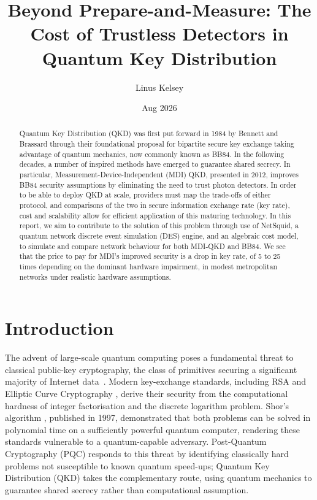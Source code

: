 \documentclass[12pt]{article}
\title{Beyond Prepare-and-Measure: The Cost of Trustless Detectors in Quantum Key Distribution}
\author{Linus Kelsey}
\date{Aug 2026}
\let\oldsection\section
\renewcommand{\section}{\clearpage\oldsection}
\begin{document}
\onehalfspacing
\maketitle
\thispagestyle{empty}

\begin{abstract}
Quantum Key Distribution (QKD) was first put forward in 1984 by Bennett and Brassard through their foundational proposal for bipartite secure key exchange taking advantage of quantum mechanics, now commonly known as BB84. In the following decades, a number of inspired methods have emerged to guarantee shared secrecy. In particular, Measurement-Device-Independent (MDI) QKD, presented in 2012, improves BB84 security assumptions by eliminating the need to trust photon detectors. In order to be able to deploy QKD at scale, providers must map the trade-offs of either protocol, and comparisons of the two in secure information exchange rate (key rate), cost and scalability allow for efficient application of this maturing technology. In this report, we aim to contribute to the solution of this problem through use of NetSquid, a quantum network discrete event simulation (DES) engine, and an algebraic cost model, to simulate and compare network behaviour for both MDI-QKD and BB84. We see that the price to pay for MDI's improved security is a drop in key rate, of 5 to 25 times depending on the dominant hardware impairment, in modest metropolitan networks under realistic hardware assumptions.
\end{abstract}

\newpage
\tableofcontents
\thispagestyle{plain}
\newpage

\section{Introduction}

The advent of large-scale quantum computing poses a fundamental threat to classical public-key cryptography, the class of primitives securing a significant majority of Internet data~\cite{Holz_2011}. Modern key-exchange standards, including RSA \cite{RSA_1978} and Elliptic Curve Cryptography \cite{Koblitz_ECC,Miller_ECC}, derive their security from the computational hardness of integer factorisation and the discrete logarithm problem. Shor's algorithm \cite{Shor_1997}, published in 1997, demonstrated that both problems can be solved in polynomial time on a sufficiently powerful quantum computer, rendering these standards vulnerable to a quantum-capable adversary. Post-Quantum Cryptography (PQC) responds to this threat by identifying classically hard problems not susceptible to known quantum speed-ups; Quantum Key Distribution (QKD) takes the complementary route, using quantum mechanics to guarantee shared secrecy rather than computational assumption.
\end{document}

